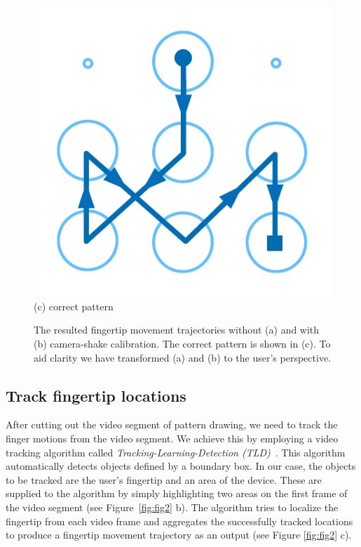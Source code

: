 \begin{figure}[!t]
{\begin{minipage}[b]{0.18\textwidth}
            \includegraphics[width=\textwidth]{fig/5-3.pdf}\\
            \centering  (c) correct pattern
            \end{minipage}
        }
        \caption{The resulted fingertip movement trajectories without (a) and with (b) camera-shake calibration.  The correct pattern is shown in (c). To aid clarity we have transformed (a) and (b) to the user's perspective.}
        \label{fig:camera_shake_illu}
         \end{figure}

\subsection{Track fingertip locations}
\label{section:tld}

        After cutting out the video segment of pattern drawing, we need to track the finger motions from the video segment. We achieve this by employing a video tracking algorithm called
        \emph{Tracking-Learning-Detection (TLD)}~\cite{kalal2012tracking}. This
        algorithm automatically detects objects defined by a boundary box. In
        our case, the objects to be tracked are the user's fingertip and an area of the device.
        These are supplied to the algorithm by simply highlighting two areas on the first frame of the video segment (see Figure~\ref{fig:fig2} b). The
        algorithm tries to localize the fingertip from each video frame and aggregates the successfully tracked locations to produce a fingertip movement trajectory as an output (see Figure
        \ref{fig:fig2} c).

